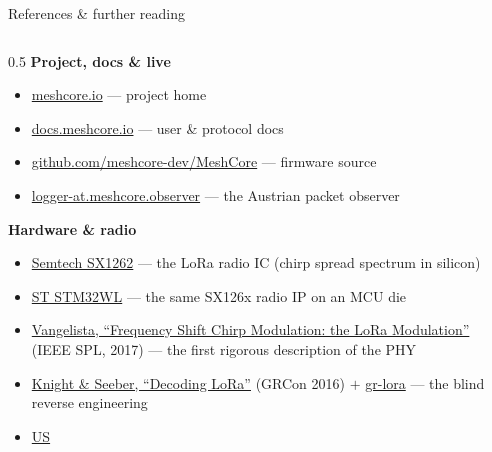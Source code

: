 \documentclass[aspectratio=\baAspect,t,9pt]{beamer}
\begin{document}

\begin{frame}[noframenumbering]{References \& further reading}
  \footnotesize
  \begin{columns}[T]
    \begin{column}{0.5\textwidth}
      \textbf{Project, docs \& live}
      \begin{itemize}
        \item \href{https://meshcore.io}{meshcore.io} --- project home
        \item \href{https://docs.meshcore.io}{docs.meshcore.io} --- user \&
          protocol docs
        \item \href{https://github.com/meshcore-dev/MeshCore}{github.com/meshcore-dev/MeshCore}
          --- firmware source
        \item \href{https://logger-at.meshcore.observer}{logger-at.meshcore.observer}
          --- the Austrian packet observer
      \end{itemize}
      \medskip
      \textbf{Hardware \& radio}
      \begin{itemize}
        \item \href{https://www.semtech.com/products/wireless-rf/lora-connect/sx1262}{Semtech SX1262}
          --- the LoRa radio IC (chirp spread spectrum in silicon)
        \item \href{https://www.st.com/en/microcontrollers-microprocessors/stm32wl5x-ex.html}{ST STM32WL}
          --- the same SX126x radio IP on an MCU die
        \item \href{https://doi.org/10.1109/LSP.2017.2762960}{Vangelista,
          ``Frequency Shift Chirp Modulation: the LoRa Modulation''} (IEEE SPL,
          2017) --- the first rigorous description of the PHY
        \item \href{https://pubs.gnuradio.org/index.php/grcon/article/view/8}{Knight
          \& Seeber, ``Decoding LoRa''} (GRCon 2016) $+$
          \href{https://github.com/BastilleResearch/gr-lora}{gr-lora} --- the
          blind reverse engineering
        \item \href{https://patents.google.com/patent/US8406275B2/en}{US
}
\end{itemize}
\end{column}
\end{columns}
\end{frame}
\end{document}
